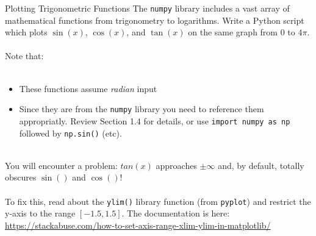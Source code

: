 \documentclass{lab}
\begin{document}
\begin{task}{Plotting Trigonometric Functions}{}
The \texttt{numpy} library includes a vast array of mathematical functions from trigonometry to logarithms. Write a Python script which plots $\sin(x)$, $\cos(x)$, and $\tan(x)$ on the same graph from $0$ to $4\pi$.
\\~\\
Note that:
\\~
\begin{itemize}
\item These functions assume \textit{radian} input
\item Since they are from the \texttt{numpy} library you need to reference them appropriatly. Review Section 1.4 for details, or use \texttt{import numpy as np} followed by \texttt{np.sin()} (etc).
\end{itemize}
~\\
You will encounter a problem: $tan(x)$ approaches $\pm \infty$ and, by default, totally obscures $\sin()$ and $\cos()$!
\\~\\
To fix this, read about the \texttt{ylim()} library function (from \texttt{pyplot}) and restrict the y-axis to the range $[-1.5, 1.5]$. The documentation is here: \url{https://stackabuse.com/how-to-set-axis-range-xlim-ylim-in-matplotlib/}
\end{task}
\end{document}

